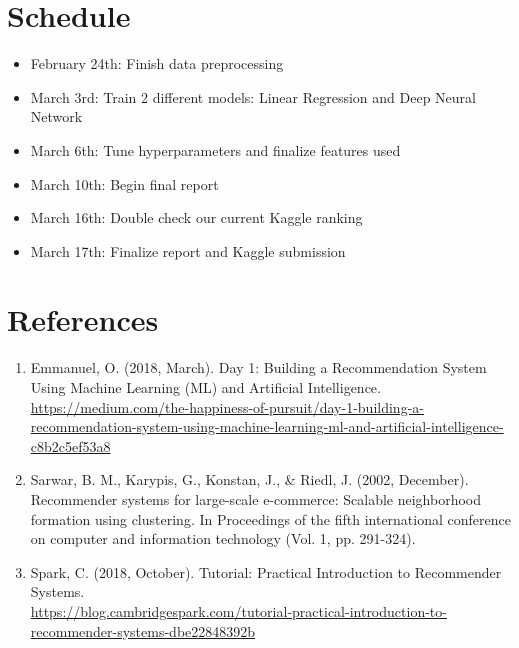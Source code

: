 \documentclass[11pt]{article}
\begin{document}
\section{Schedule}

\begin{itemize}
    \item February 24th: Finish data preprocessing
    \item March 3rd: Train 2 different models: Linear Regression and Deep Neural Network
    \item March 6th: Tune hyperparameters and finalize features used
    \item March 10th: Begin final report
    \item March 16th: Double check our current Kaggle ranking
    \item March 17th: Finalize report and Kaggle submission
\end{itemize}

\section{References}

\begin{enumerate}
    \item Emmanuel, O. (2018, March). Day 1: Building a Recommendation System Using Machine Learning (ML) and Artificial Intelligence.\\
    \scriptsize
    \href{https://medium.com/the-happiness-of-pursuit/day-1-building-a-recommendation-system-using-machine-learning-ml-and-artificial-intelligence-c8b2c5ef53a8}
    {https://medium.com/the-happiness-of-pursuit/day-1-building-a-recommendation-system-using-machine-learning-ml-and-artificial-intelligence-c8b2c5ef53a8}
    \normalsize

    \item Sarwar, B. M., Karypis, G., Konstan, J., \& Riedl, J. (2002, December). Recommender systems for large-scale e-commerce:
    Scalable neighborhood formation using clustering. In Proceedings of the fifth international conference on computer and information technology (Vol. 1, pp. 291-324).

    \item Spark, C. (2018, October). Tutorial: Practical Introduction to Recommender Systems.\\
    \scriptsize
    \href{https://blog.cambridgespark.com/tutorial-practical-introduction-to-recommender-systems-dbe22848392b}
    {https://blog.cambridgespark.com/tutorial-practical-introduction-to-recommender-systems-dbe22848392b}
    \normalsize
\end{enumerate}
\end{document}
